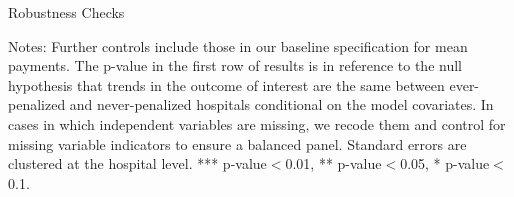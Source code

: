 \documentclass[12pt]{article}
\begin{document}
\setlength{\captionmargin}{.5 \textwidth} \addtolength{\captionmargin}{-.5\wd\gfxbox}
\begin{table}[htbp!]
\centering
\caption{Robustness Checks}
\label{tab:robustness}
\usebox{\gfxbox}
\par
\begin{minipage}{\wd\gfxbox}
\footnotesize
Notes: Further controls include those in our baseline specification for mean payments.  The p-value in the first row of results is in reference to the null hypothesis that trends in the outcome of interest are the same between ever-penalized and never-penalized hospitals conditional on the model covariates.  In cases in which independent variables are missing, we recode them and control for missing variable indicators to ensure a balanced panel.  Standard errors are clustered at the hospital level.  *** p-value$<$0.01, ** p-value$<$0.05, * p-value$<$0.1.
\end{minipage}
\end{table}
\end{document}
